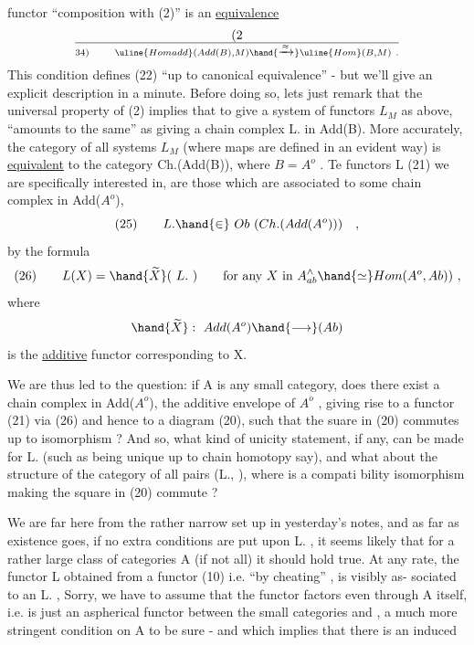functor ``composition with (2)'' is an \uline{equivalence}
\[ (2\over{3}{4}) \qquad \uline{Homadd}(Add(B),M) \hand{\xrightarrow{\approx}} \uline{Hom}(B,M) \ . \]
This condition defines (22) ``up to canonical equivalence'' - but we'll
give an explicit description in a minute. Before doing so, lets
just remark that the universal property of (2) implies that to give
a system of functors $L_M$ as above, ``amounts to the same'' as giving a
chain complex L. in Add(B). More accurately, the category of all
systems $L_M$ (where maps are defined in an evident way) is \uline{equivalent}
to the category Ch.(Add(B)), where $B=A^o$ . Te functors L (21)
we are specifically interested in, are those which are associated to
some chain complex in Add($A^o$),
\[ (25) \qquad L. \hand{\in} \ Ob\ (Ch.(Add(A^o))) \quad , \]
by the formula
\[ (26) \qquad L(X) = \hand{\widetilde{X}}(\ L.\ ) \qquad \text{for any } X \text{ in } A^{\wedge}_{ab} \hand{\simeq} Hom(A^o,Ab)) \ , \]
where
\[ \hand{\widetilde{X}} : \ Add(A^o) \hand{\longrightarrow} (Ab) \]
is the \uline{additive} functor corresponding to X.

We are thus led to the question: if A is any small category,
does there exist a chain complex  in Add($A^o$), the additive envelope of
$A^o$ , giving rise to a functor (21) via (26) and hence to a diagram
(20), such that the suare in (20) commutes up to isomorphism ? And
  so, what kind of unicity statement, if any, can be made for L.
(such as being unique up to chain homotopy say), and what about the
structure of the category of all pairs (L., \hand{$\lambda$} ), where \hand{$\lambda$} is a compati
bility isomorphism making the square in (20) commute ?

We are far here from the rather narrow set up in yesterday's
notes, and as far as existence goes, if no extra conditions are put
upon L. , it seems likely that for a rather large class of  categories
A (if not all) it should hold true. At any rate, the functor L
obtained from a  functor (10) i.e. ``by cheating'' , is visibly as-%
sociated to an L. ,  Sorry, we have to assume that the
functor  factors even through A itself, i.e. is just an aspherical
functor between the small categories \hand{$\Delta$} and  , a much more stringent
condition on A to be sure - and which implies that there is an induced

